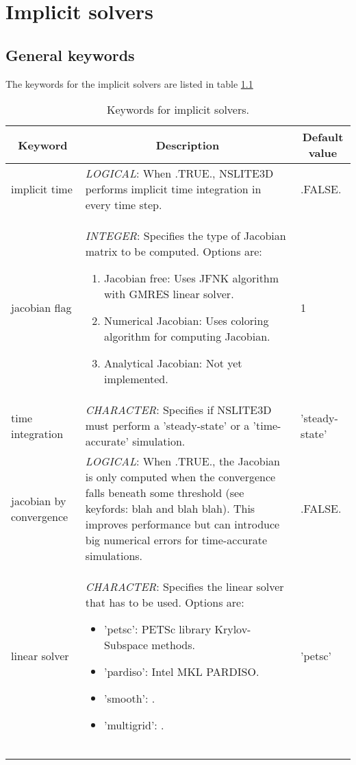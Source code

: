 \documentclass[a4paper,10pt]{report}
\begin{document}
\chapter{Implicit solvers}
\section{General keywords}
The keywords for the implicit solvers are listed in table \ref{tab:implicitkey}

\begin{table}[htbp]
\caption{Keywords for implicit solvers.}
\begin{tabular}{|l|p{10cm}|p{2.2cm}|}
\hline
\multicolumn{1}{|c|}{Keyword} & \multicolumn{1}{c|}{Description} & \multicolumn{1}{c|}{Default value} \\ \hline

implicit time & \textit{LOGICAL}: When .TRUE., NSLITE3D performs implicit time integration in every time step. & .FALSE. \\ \hline

jacobian flag           & \textit{INTEGER}: Specifies the type of Jacobian matrix to be computed. Options are:\
				\begin{enumerate}
					\item Jacobian free: Uses JFNK algorithm with GMRES linear solver.
					\item Numerical Jacobian: Uses coloring algorithm for computing Jacobian.
					\item Analytical Jacobian: Not yet implemented.
					\end{enumerate}
										& 1 \\ \hline

time integration        & \textit{CHARACTER}: Specifies if NSLITE3D must perform a 'steady-state' or a 'time-accurate' simulation. &  'steady-state'\\ \hline

jacobian by convergence & \textit{LOGICAL}: When .TRUE., the Jacobian is only computed when the convergence falls beneath some threshold (see keyfords: blah and blah blah). This improves performance but can introduce big numerical errors for time-accurate simulations.  & .FALSE. \\ \hline

linear solver           & \textit{CHARACTER}: Specifies the linear solver that has to be used. Options are:\ 
				\begin{itemize}
					\item 'petsc': PETSc library Krylov-Subspace methods.
					\item 'pardiso': Intel MKL PARDISO.
					\item 'smooth': .
					\item 'multigrid': .
				\end{itemize}
										& 'petsc'  \\ \hline

  &  &  \\ \hline
   &  &  \\ \hline
    &  &  \\ \hline
\end{tabular}
\label{tab:implicitkey}
\end{table}
\end{document}
